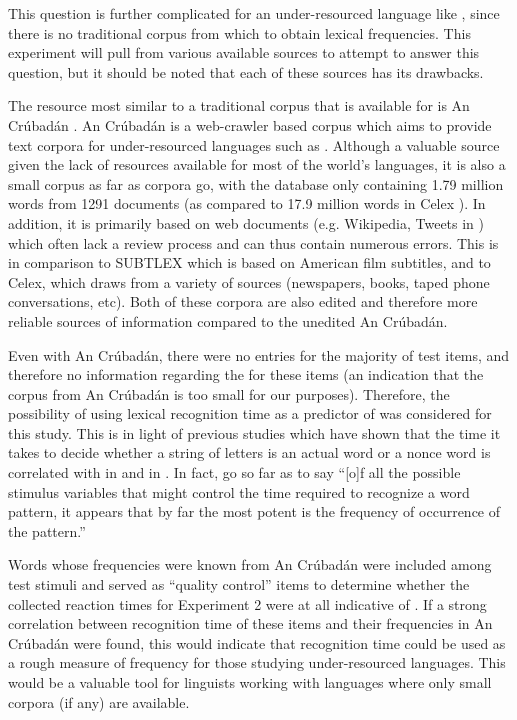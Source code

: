 \documentclass[output=paper
,newtxmath
,modfonts
,nonflat]{langsci/langscibook}
\begin{document}
This question is further complicated for an under-resourced language like , since there is no traditional corpus from which to obtain lexical frequencies. This experiment will pull from various available sources to attempt to answer this question, but it should be noted that each of these sources has its drawbacks. 

The resource most similar to a traditional corpus that is available for  is An Crúbadán \citep{scannell2007crubadan}. An Crúbadán is a web-crawler based corpus which aims to provide text corpora for under-resourced languages such as . Although a valuable source given the lack of resources available for most of the world’s languages, it is also a small corpus as far as corpora go, with the  database only containing 1.79 million words from 1291 documents (as compared to 17.9 million words in Celex \citep{BaayenEtAl1993}). In addition, it is primarily based on web documents (e.g.  Wikipedia, Tweets in ) which often lack a review process and can thus contain numerous errors. This is in comparison to SUBTLEX which is based on American film subtitles, and to Celex, which draws from a variety of sources (newspapers, books, taped phone conversations, etc). Both of these corpora are also edited and therefore more reliable sources of information compared to the unedited An Crúbadán.

Even with An Crúbadán, there were no entries for the majority of test items, and therefore no information regarding the  for these items (an indication that the  corpus from An Crúbadán is too small for our purposes). Therefore, the possibility of using lexical recognition time as a predictor of  was considered for this study. This is in light of previous studies which have shown that the time it takes to decide whether a string of letters is an actual word or a nonce word is correlated with  in  \citep{brysbaert2011word} and in  \citep{baayen2006morphological}. In fact,  \citet{murray2004serial} go so far as to say “[o]f all the possible stimulus variables that might control the time required to recognize a word pattern, it appears that by far the most potent is the frequency of occurrence of the pattern.” 

Words whose frequencies were known from An Crúbadán were included among test stimuli and served as “quality control” items to determine whether the collected reaction times for Experiment 2 were at all indicative of . If a strong correlation between recognition time of these items and their frequencies in An Crúbadán were found, this would indicate that recognition time could be used as a rough measure of frequency for those studying under-resourced languages. This would be a valuable tool for linguists working with languages where only small corpora (if any) are available.
\end{document}
